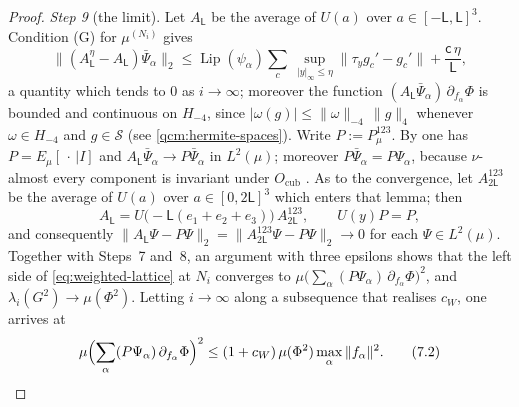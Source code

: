 \documentclass[11pt,letterpaper,reqno]{amsart}
\theoremstyle{definition}
\begin{document}
\begin{proof}
\emph{Step 9} (the limit).
Let $A_{\mathsf L}$ be the average of $U(a)$ over $a\in[-\mathsf L,\mathsf L]^3$.
Condition (G) for $\mu^{(N_i)}$ gives
\begin{equation*}
\|(A^\eta_{\mathsf L}-A_{\mathsf L})\bar\Psi_\alpha\|_2\le\operatorname{Lip}(\psi_\alpha)\sum_c\ \sup_{|y|_\infty\le\eta}\|\tau_yg_c'-g_c'\|+\frac{\mathsf c\,\eta}{\mathsf L},
\end{equation*}
a quantity which tends to $0$ as $i\to\infty$;
moreover the function $(A_{\mathsf L}\bar\Psi_\alpha)\,\partial_{f_\alpha}\Phi$ is bounded and continuous on $H_{-4}$, since $|\omega(g)|\le\|\omega\|_{-4}\,\|g\|_4$ whenever $\omega\in H_{-4}$ and $g\in\mathcal S$ (see \eqref{qcm:hermite-spaces}).
Write $P:=P^{123}_\mu$.
By \cite[Lemma~7.2]{ErgodicComponents} one has $P=E_\mu[\,\cdot\,|I]$ and $A_{\mathsf L}\bar\Psi_\alpha\to P\bar\Psi_\alpha$ in $L^2(\mu)$;
moreover $P\bar\Psi_\alpha=P\Psi_\alpha$, because $\nu$-almost every component is invariant under $O_{\mathrm{cub}}$ \cite[Section~6, Section~7.5, and Theorem~8.6]{QEDConstruction}.
As to the convergence, let $A^{123}_{2\mathsf L}$ be the average of $U(a)$ over $a\in[0,2\mathsf L]^3$ which enters that lemma;
then
\begin{equation*}
A_{\mathsf L}=U\bigl(-\mathsf L(e_1+e_2+e_3)\bigr)\,A^{123}_{2\mathsf L},\qquad U(y)P=P,
\end{equation*}
and consequently $\|A_{\mathsf L}\Psi-P\Psi\|_2=\allowbreak \|A^{123}_{2\mathsf L}\Psi-P\Psi\|_2\to0$ for each $\Psi\in L^2(\mu)$.
Together with Steps~7 and~8, an argument with three epsilons shows that the left side of \eqref{eq:weighted-lattice} at $N_i$ converges to $\mu\bigl(\sum_\alpha(P\Psi_\alpha)\,\allowbreak \partial_{f_\alpha}\Phi\bigr)^2$, and $\lambda_i(G^2)\to\mu(\Phi^2)$.
Letting $i\to\infty$ along a subsequence that realises $c_W$, one arrives at
\begin{equation}
\mu\Bigl(\sum_\alpha(P\Psi_\alpha)\,\partial_{f_\alpha}\Phi\Bigr)^2\le(1+c_W)\,\mu(\Phi^2)\max_\alpha\|f_\alpha\|^2.
\tag{7.2}\label{eq:weighted-continuum}
\end{equation}


\end{proof}
\end{document}
